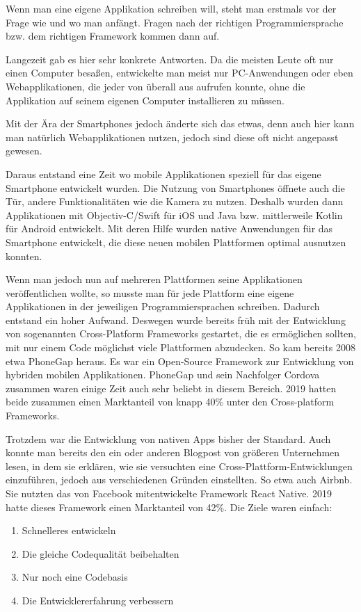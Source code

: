 Wenn man eine eigene Applikation schreiben will, steht man erstmals vor der Frage wie und wo man anfängt.
Fragen nach der richtigen Programmiersprache bzw. dem richtigen Framework kommen dann auf.

Langezeit gab es hier sehr konkrete Antworten. Da die meisten Leute oft nur einen Computer besaßen, entwickelte man meist nur PC-Anwendungen oder eben Webapplikationen, die jeder von überall aus aufrufen konnte, ohne die Applikation auf seinem eigenen Computer installieren zu müssen.

Mit der Ära der Smartphones jedoch änderte sich das etwas, denn auch hier kann man natürlich Webapplikationen nutzen, jedoch sind diese oft nicht angepasst gewesen.

Daraus entstand eine Zeit wo mobile Applikationen speziell für das eigene Smartphone entwickelt wurden. Die Nutzung von Smartphones öffnete auch die Tür, andere Funktionalitäten wie die Kamera zu nutzen. Deshalb wurden dann Applikationen mit Objectiv-C/Swift für iOS und Java bzw. mittlerweile Kotlin für Android entwickelt. Mit deren Hilfe wurden native Anwendungen für das Smartphone entwickelt, die diese neuen mobilen Plattformen optimal ausnutzen konnten.

Wenn man jedoch nun auf mehreren Plattformen seine Applikationen veröffentlichen wollte, so musste man für jede Plattform eine eigene Applikationen in der jeweiligen Programmiersprachen schreiben. Dadurch entstand ein hoher Aufwand. Deswegen wurde bereits früh mit der Entwicklung von sogenannten Cross-Platform Frameworks gestartet, die es ermöglichen sollten, mit nur einem Code möglichst viele Plattformen abzudecken. So kam bereits 2008 etwa PhoneGap heraus. Es war ein Open-Source Framework zur Entwicklung von hybriden mobilen Applikationen. PhoneGap und sein Nachfolger Cordova zusammen waren einige Zeit auch sehr beliebt in diesem Bereich. 2019 hatten beide zusammen einen Marktanteil von knapp 40\% unter den Cross-platform Frameworks.\cite{statist_CP_Framework}

Trotzdem war die Entwicklung von nativen Apps bisher der Standard. Auch konnte man bereits den ein oder anderen Blogpost von größeren Unternehmen lesen, in dem sie erklären, wie sie versuchten eine  Cross-Plattform-Entwicklungen einzuführen, jedoch aus verschiedenen Gründen einstellten. So etwa auch Airbnb. Sie nutzten das von Facebook mitentwickelte Framework React Native. 2019 hatte dieses Framework einen Marktanteil von 42\%. 
\break
Die Ziele waren einfach:
\begin{enumerate}
    \item Schnelleres entwickeln
    \item Die gleiche Codequalität beibehalten
    \item Nur noch eine Codebasis
    \item Die Entwicklererfahrung verbessern\cite{Airbnb_react_goals}
\end{enumerate}

